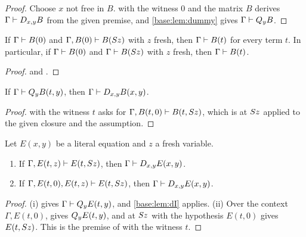 \begin{proof}
Choose $x$ not free in $B$.   with the witness $0$ and the
matrix $B$ derives $\Gamma\vdash D_{x,y}B$ from the given premise, and
\cref{base:lem:dummy} gives $\Gamma\vdash Q_{y}B$.
\end{proof}

\begin{corollary}
\label{base:cor:cases}
If $\Gamma\vdash B(0)$ and $\Gamma,B(0)\vdash B(S z)$ with $z$ fresh,
then $\Gamma\vdash B(t)$ for every term $t$.  In particular, if
$\Gamma\vdash B(0)$ and $\Gamma\vdash B(S z)$ with $z$ fresh, then
$\Gamma\vdash B(t)$.
\end{corollary}

\begin{proof}
 and .
\end{proof}

\begin{lemma}
\label{base:lem:dI}
If $\Gamma\vdash Q_{y}B(t,y)$, then $\Gamma\vdash D_{x,y}B(x,y)$.
\end{lemma}

\begin{proof}
 with the witness $t$ asks for
$\Gamma,B(t,0)\vdash B(t,S z)$, which is  at $S z$
applied to the given closure and the assumption.
\end{proof}

\begin{corollary}
\label{base:cor:combined}
Let $E(x,y)$ be a literal equation and $z$ a fresh variable.
\begin{enumerate}[label=\textup{(\roman*)}]
\item If $\Gamma,E(t,z)\vdash E(t,S z)$, then
 $\Gamma\vdash D_{x,y}E(x,y)$.
\item If $\Gamma,E(t,0),E(t,z)\vdash E(t,S z)$, then
 $\Gamma\vdash D_{x,y}E(x,y)$.
\end{enumerate}
\end{corollary}

\begin{proof}
(i)  gives $\Gamma\vdash Q_{y}E(t,y)$, and \cref{base:lem:dI}
applies.  (ii) Over the context $\Gamma,E(t,0)$,  gives
$Q_{y}E(t,y)$, and  at $S z$ with the hypothesis $E(t,0)$
gives $E(t,S z)$.  This is the premise of  with the witness
$t$.
\end{proof}

